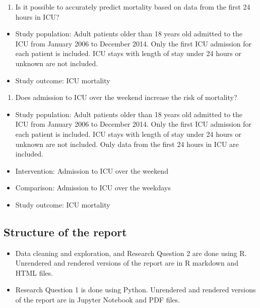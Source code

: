 \documentclass[
]{article}
\providecommand{\tightlist}{%
  \setlength{\itemsep}{0pt}\setlength{\parskip}{0pt}}
\begin{document}
\begin{enumerate}
\def\labelenumi{\arabic{enumi}.}
\tightlist
\item
  Is it possible to accurately predict mortality based on data from the
  first 24 hours in ICU?
\end{enumerate}

\begin{itemize}
\tightlist
\item
  Study population: Adult patients older than 18 years old admitted to
  the ICU from January 2006 to December 2014. Only the first ICU
  admission for each patient is included. ICU stays with length of stay
  under 24 hours or unknown are not included.
\item
  Study outcome: ICU mortality
\end{itemize}

\begin{enumerate}
\def\labelenumi{\arabic{enumi}.}
\setcounter{enumi}{1}
\tightlist
\item
  Does admission to ICU over the weekend increase the risk of mortality?
\end{enumerate}

\begin{itemize}
\tightlist
\item
  Study population: Adult patients older than 18 years old admitted to
  the ICU from January 2006 to December 2014. Only the first ICU
  admission for each patient is included. ICU stays with length of stay
  under 24 hours or unknown are not included. Only data from the first
  24 hours in ICU are included.
\item
  Intervention: Admission to ICU over the weekend
\item
  Comparison: Admission to ICU over the weekdays
\item
  Study outcome: ICU mortality
\end{itemize}

\hypertarget{structure-of-the-report}{%
\subsection{Structure of the report}\label{structure-of-the-report}}

\begin{itemize}
\tightlist
\item
  Data cleaning and exploration, and Research Question 2 are done using
  R. Unrendered and rendered versions of the report are in R markdown
  and HTML files.
\item
  Research Question 1 is done using Python. Unrendered and rendered
  versions of the report are in Jupyter Notebook and PDF files.
\end{itemize}
\end{document}
